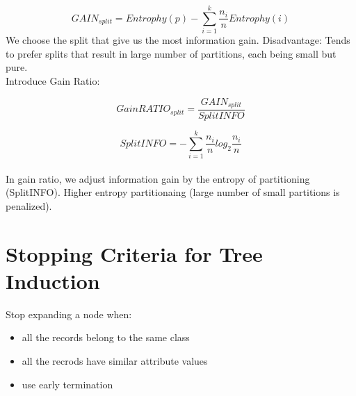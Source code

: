 \begin{multicols*}{2}
$$GAIN_{split}=Entrophy(p)-\sum_{i=1}^{k} \frac{n_i}{n}Entrophy(i)$$
\noindent We choose the split that give us the most information gain. Disadvantage: Tends to prefer splits that result in large number of partitions, each being small but pure. \\

\noindent Introduce Gain Ratio: 

$$GainRATIO_{split}=\frac{GAIN_{split}}{SplitINFO}$$

$$SplitINFO=-\sum_{i=1}^{k} \frac{n_i}{n}log_2 \frac{n_i}{n}$$ \\

\noindent In gain ratio, we adjust information gain by the entropy of partitioning (SplitINFO). Higher entropy partitionaing (large number of small partitions is penalized). 

\section{Stopping Criteria for Tree Induction}

Stop expanding a node when:
\begin{itemize}
    \item all the records belong to the same class
    \item all the recrods have similar attribute values
    \item use early termination
\end{itemize}

\end{multicols*}
